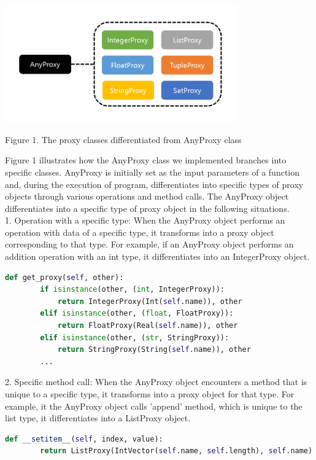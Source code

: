 \documentclass[11pt]{article}
\begin{document}
\begin{center}
\includegraphics[width = 10cm]{Anyproxy_to_proxies.PNG}

{Figure 1. The proxy classes differentiated from AnyProxy class}
\end{center}

Figure 1 illustrates how the AnyProxy class we implemented branches into specific classes. AnyProxy is initially set as the input parameters of a function and, during the execution of program, differentiates into specific types of proxy objects through various operations and method calls. The AnyProxy object differentiates into a specific type of proxy object in the following situations. \\

1. Operation with a specific type: When the AnyProxy object performs an operation with data of a specific type, it transforms into a proxy object corresponding to that type. For example, if an AnyProxy object performs an addition operation with an int type, it differentiates into an IntegerProxy object. \\

\begin{lstlisting}[language=python]
def get_proxy(self, other):
        if isinstance(other, (int, IntegerProxy)):
            return IntegerProxy(Int(self.name)), other
        elif isinstance(other, (float, FloatProxy)):
            return FloatProxy(Real(self.name)), other
        elif isinstance(other, (str, StringProxy)):
            return StringProxy(String(self.name)), other
        ...
\end{lstlisting}

2. Specific method call: When the AnyProxy object encounters a method that is unique to a specific type, it transforms into a proxy object for that type. For example, it the AnyProxy object calls 'append' method, which is unique to the list type, it differentiates into a ListProxy object. \\

\begin{lstlisting}[language=python]
def __setitem__(self, index, value):
        return ListProxy(IntVector(self.name, self.length), self.name).__setitem__(index, value)
\end{lstlisting}
\end{document}
